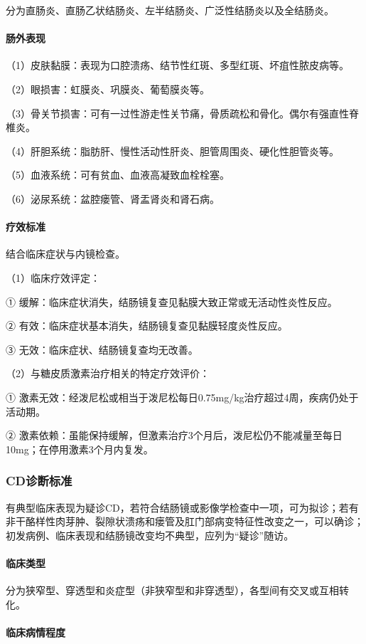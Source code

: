 分为直肠炎、直肠乙状结肠炎、左半结肠炎、广泛性结肠炎以及全结肠炎。
\paragraph{肠外表现}

（1）皮肤黏膜：表现为口腔溃疡、结节性红斑、多型红斑、坏疽性脓皮病等。

（2）眼损害：虹膜炎、巩膜炎、葡萄膜炎等。

（3）骨关节损害：可有一过性游走性关节痛，骨质疏松和骨化。偶尔有强直性脊椎炎。

（4）肝胆系统：脂肪肝、慢性活动性肝炎、胆管周围炎、硬化性胆管炎等。

（5）血液系统：可有贫血、血液高凝致血栓栓塞。

（6）泌尿系统：盆腔瘘管、肾盂肾炎和肾石病。
\paragraph{疗效标准}

结合临床症状与内镜检查。

（1）临床疗效评定：

① 缓解：临床症状消失，结肠镜复查见黏膜大致正常或无活动性炎性反应。

② 有效：临床症状基本消失，结肠镜复查见黏膜轻度炎性反应。

③ 无效：临床症状、结肠镜复查均无改善。

（2）与糖皮质激素治疗相关的特定疗效评价：

①
激素无效：经泼尼松或相当于泼尼松每日0.75mg/kg治疗超过4周，疾病仍处于活动期。

②
激素依赖：虽能保持缓解，但激素治疗3个月后，泼尼松仍不能减量至每日10mg；在停用激素3个月内复发。

\subsubsection{CD诊断标准}

有典型临床表现为疑诊CD，若符合结肠镜或影像学检查中一项，可为拟诊；若有非干酪样性肉芽肿、裂隙状溃疡和瘘管及肛门部病变特征性改变之一，可以确诊；初发病例、临床表现和结肠镜改变均不典型，应列为“疑诊”随访。
\paragraph{临床类型}

分为狭窄型、穿透型和炎症型（非狭窄型和非穿透型），各型间有交叉或互相转化。
\paragraph{临床病情程度}

